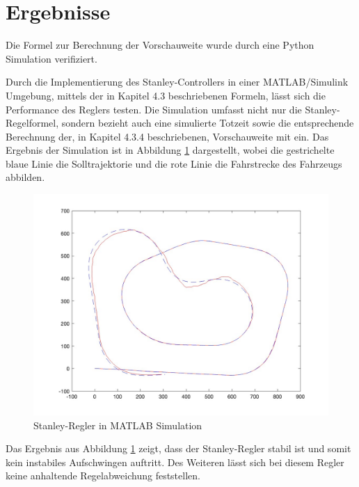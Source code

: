 \section{Ergebnisse}

Die Formel zur Berechnung der Vorschauweite wurde durch eine Python Simulation verifiziert. \cite{vorschauweite_notebook}

Durch die Implementierung des Stanley-Controllers in einer MATLAB/Simulink Umgebung, mittels der in Kapitel 4.3 beschriebenen Formeln, lässt sich die Performance des Reglers testen. Die Simulation umfasst nicht nur die Stanley-Regelformel, sondern bezieht auch eine simulierte Totzeit sowie die entsprechende Berechnung der, in Kapitel 4.3.4 beschriebenen, Vorschauweite mit ein. Das Ergebnis der Simulation ist in Abbildung \ref{fig:stanley_matlab_simulationsergebniss} dargestellt, wobei die gestrichelte blaue Linie die Solltrajektorie und die rote Linie die Fahrstrecke des Fahrzeugs abbilden.

\begin{figure}[H]
    \centering
    \includegraphics[width=1\linewidth]{Pictures/stanley_controller_performance_matlab.jpg}
    \caption{Stanley-Regler in MATLAB Simulation}
    \label{fig:stanley_matlab_simulationsergebniss}
\end{figure}

 Das Ergebnis aus Abbildung \ref{fig:stanley_matlab_simulationsergebniss} zeigt, dass der Stanley-Regler stabil ist und somit kein instabiles Aufschwingen auftritt. Des Weiteren lässt sich bei diesem Regler keine anhaltende Regelabweichung feststellen.


